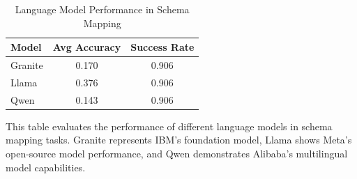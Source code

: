
\begin{table}[htbp]
\centering
\caption{Language Model Performance in Schema Mapping}
\label{tab:model_comparison}
\begin{tabular}{lcc}
\toprule
\textbf{Model} & \textbf{Avg Accuracy} & \textbf{Success Rate} \\
\midrule
Granite & 0.170 & 0.906 \\
Llama & 0.376 & 0.906 \\
Qwen & 0.143 & 0.906 \\
\bottomrule
\end{tabular}
\end{table}

This table evaluates the performance of different language models in schema mapping tasks. Granite represents IBM's foundation model, Llama shows Meta's open-source model performance, and Qwen demonstrates Alibaba's multilingual model capabilities.

